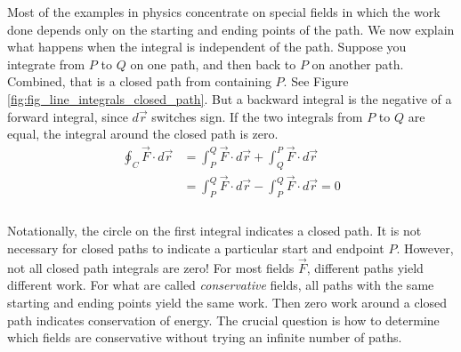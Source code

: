 
Most of the examples in physics concentrate on special fields in which the work done depends only on the starting and ending points of the path. We now explain what happens when the integral is independent of the path. Suppose you integrate from $P$ to $Q$ on one path, and then back to $P$ on another path. Combined, that is a closed path from containing $P$. See Figure \ref{fig:fig_line_integrals_closed_path}. But a backward integral is the negative of a forward integral, since $d\vec r$ switches sign. If the two integrals from $P$ to $Q$ are equal, the integral around the closed path is zero.
\begin{align*}
\oint_C \vec F \cdot d\vec r & = \int_P^Q \vec F \cdot d\vec r + \int_Q^P \vec F \cdot d\vec r \\
 & = \int_P^Q\vec F \cdot d\vec r - \int_P^Q\vec F \cdot d\vec r = 0 \\
\end{align*}\\

Notationally, the circle on the first integral indicates a closed path. It is not necessary for closed paths to indicate a particular start and endpoint $P$. However, not all closed path integrals are zero! For most fields $\vec F$, different paths yield
different work. For what are called \emph{conservative} fields, all paths with the same starting and ending points yield the same work. Then zero work around a closed path indicates conservation of energy. The crucial question is how to determine which fields are conservative without trying an infinite number of paths.\\

\\

